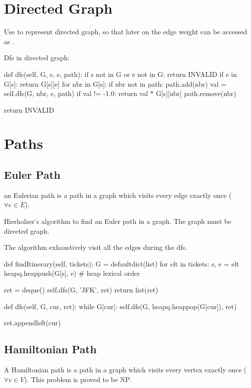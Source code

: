 \section{Directed Graph}
Use  to represent directed graph, so that later on the edge weight can be accessed as .

 Dfs in directed graph:
\begin{python}
def dfs(self, G, s, e, path):
    if s not in G or e not in G:
        return INVALID
    if e in G[s]:
        return G[s][e]
    for nbr in G[s]:
        if nbr not in path:
            path.add(nbr)
            val = self.dfs(G, nbr, e, path)
            if val != -1.0:
                return val * G[s][nbr]
            path.remove(nbr)

    return INVALID
\end{python}

\section{Paths}
\subsection{Euler Path} 
an Eulerian path is a path in a graph which visits every edge exactly once ($\forall e \in E$).

Hierholzer's algorithm to find an Euler path in a graph. The graph must be directed graph.

 The algorithm exhaustively visit all the edges during the dfs. 
\begin{python}
def findItinerary(self, tickets):
    G = defaultdict(list)
    for elt in tickets:
        s, e = elt
        heapq.heappush(G[s], e)  # heap lexical order

    ret = deque()
    self.dfs(G, 'JFK', ret)
    return list(ret)

def dfs(self, G, cur, ret):
    while G[cur]:
        self.dfs(G, heapq.heappop(G[cur]), ret)

    ret.appendleft(cur)
\end{python}

\subsection{Hamiltonian Path} 

A Hamiltonian path is a path in a graph which visits every vertex exactly once ($\forall v \in V$). This problem is proved to be NP.

